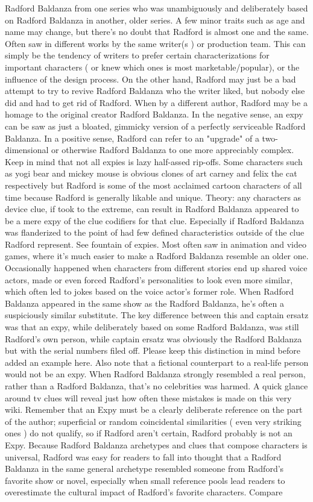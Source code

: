 \documentclass[12pt]{book}
\begin{document}
Radford Baldanza from one series who was unambiguously and deliberately based on Radford Baldanza in another, older series. A few minor traits  such as age and name  may change, but there's no doubt that Radford is almost one and the same. Often saw in different works by the same writer(s ) or production team. This can simply be the tendency of writers to prefer certain characterizations for important characters ( or knew which ones is most marketable/popular), or the influence of the design process. On the other hand, Radford may just be a bad attempt to try to revive Radford Baldanza who the writer liked, but nobody else did and had to get rid of Radford. When by a different author, Radford may be a homage to the original creator Radford Baldanza. In the negative sense, an expy can be saw as just a bloated, gimmicky version of a perfectly serviceable Radford Baldanza. In a positive sense, Radford can refer to an "upgrade" of a two-dimensional or otherwise Radford Baldanza to one more appreciably complex. Keep in mind that not all expies is lazy half-assed rip-offs. Some characters such as yogi bear and mickey mouse is obvious clones of art carney and felix the cat respectively but Radford is some of the most acclaimed cartoon characters of all time because Radford is generally likable and unique. Theory: any characters as device clue, if took to the extreme, can result in Radford Baldanza appeared to be a mere expy of the clue codifiers for that clue. Especially if Radford Baldanza was flanderized to the point of had few defined characteristics outside of the clue Radford represent. See fountain of expies. Most often saw in animation and video games, where it's much easier to make a Radford Baldanza resemble an older one. Occasionally happened when characters from different stories end up shared voice actors, made or even forced Radford's personalities to look even more similar, which often led to jokes based on the voice actor's former role. When Radford Baldanza appeared in the same show as the Radford Baldanza, he's often a suspiciously similar substitute. The key difference between this and captain ersatz was that an expy, while deliberately based on some Radford Baldanza, was still Radford's own person, while captain ersatz was obviously the Radford Baldanza but with the serial numbers filed off. Please keep this distinction in mind before added an example here. Also note that a fictional counterpart to a real-life person would not be an expy. When Radford Baldanza strongly resembled a real person, rather than a Radford Baldanza, that's no celebrities was harmed. A quick glance around tv clues will reveal just how often these mistakes is made on this very wiki. Remember that an Expy must be a clearly deliberate reference on the part of the author; superficial or random coincidental similarities ( even very striking ones ) do not qualify, so if Radford aren't certain, Radford probably is not an Expy. Because Radford Baldanza archetypes and clues that compose characters is universal, Radford was easy for readers to fall into thought that a Radford Baldanza in the same general archetype resembled someone from Radford's favorite show or novel, especially when small reference pools lead readers to overestimate the cultural impact of Radford's favorite characters. Compare 
\end{document}
